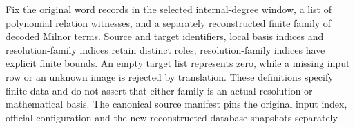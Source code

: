 \begin{definition}
  \label{def:lin-naturality-batch21-data}
  \leanok
  Fix the original word records in the selected internal-degree window,
  a list of polynomial relation witnesses, and a separately reconstructed
  finite family of decoded Milnor terms. Source and target identifiers,
  local basis indices and resolution-family indices retain distinct roles;
  resolution-family indices have explicit finite bounds. An empty target list represents zero, while a missing
  input row or an unknown image is rejected by translation.
  These definitions specify finite data and do not assert that either
  family is an actual resolution or mathematical basis. The canonical
  source manifest pins the original input index, official configuration
  and the new reconstructed database snapshots separately.
\end{definition}

